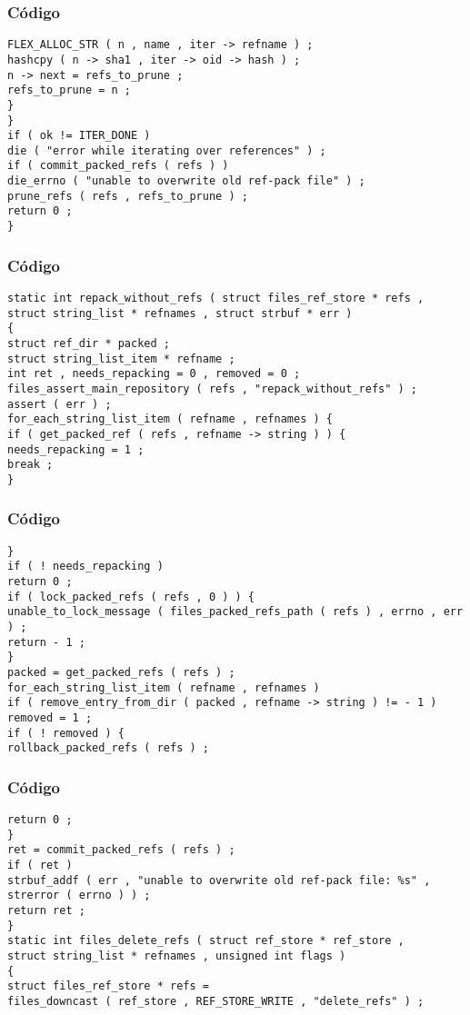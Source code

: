 \documentclass{beamer}
\begin{document}
\begin{frame}[fragile]
\frametitle{C\'odigo}
\begin{verbatim}
FLEX_ALLOC_STR ( n , name , iter -> refname ) ; 
hashcpy ( n -> sha1 , iter -> oid -> hash ) ; 
n -> next = refs_to_prune ; 
refs_to_prune = n ; 
} 
} 
if ( ok != ITER_DONE ) 
die ( "error while iterating over references" ) ; 
if ( commit_packed_refs ( refs ) ) 
die_errno ( "unable to overwrite old ref-pack file" ) ; 
prune_refs ( refs , refs_to_prune ) ; 
return 0 ; 
} 
\end{verbatim}
\end{frame}
\begin{frame}[fragile]
\frametitle{C\'odigo}
\begin{verbatim}
static int repack_without_refs ( struct files_ref_store * refs , 
struct string_list * refnames , struct strbuf * err ) 
{ 
struct ref_dir * packed ; 
struct string_list_item * refname ; 
int ret , needs_repacking = 0 , removed = 0 ; 
files_assert_main_repository ( refs , "repack_without_refs" ) ; 
assert ( err ) ; 
for_each_string_list_item ( refname , refnames ) { 
if ( get_packed_ref ( refs , refname -> string ) ) { 
needs_repacking = 1 ; 
break ; 
} 
\end{verbatim}
\end{frame}
\begin{frame}[fragile]
\frametitle{C\'odigo}
\begin{verbatim}
} 
if ( ! needs_repacking ) 
return 0 ; 
if ( lock_packed_refs ( refs , 0 ) ) { 
unable_to_lock_message ( files_packed_refs_path ( refs ) , errno , err ) ; 
return - 1 ; 
} 
packed = get_packed_refs ( refs ) ; 
for_each_string_list_item ( refname , refnames ) 
if ( remove_entry_from_dir ( packed , refname -> string ) != - 1 ) 
removed = 1 ; 
if ( ! removed ) { 
rollback_packed_refs ( refs ) ; 
\end{verbatim}
\end{frame}
\begin{frame}[fragile]
\frametitle{C\'odigo}
\begin{verbatim}
return 0 ; 
} 
ret = commit_packed_refs ( refs ) ; 
if ( ret ) 
strbuf_addf ( err , "unable to overwrite old ref-pack file: %s" , 
strerror ( errno ) ) ; 
return ret ; 
} 
static int files_delete_refs ( struct ref_store * ref_store , 
struct string_list * refnames , unsigned int flags ) 
{ 
struct files_ref_store * refs = 
files_downcast ( ref_store , REF_STORE_WRITE , "delete_refs" ) ; 
\end{verbatim}
\end{frame}
\end{document}
